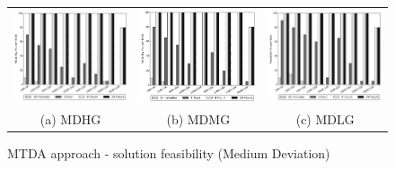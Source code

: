 \begin{figure}
\begin{tabular}{ccc}
\includegraphics[width=.30\linewidth,keepaspectratio]{figs/feasibility_cvs_oarb_medium_highr_mtd.png} &
\includegraphics[width=.30\linewidth,keepaspectratio]{figs/feasibility_cvs_oarb_medium_mediumr_mtd.png} &
\includegraphics[width=.30\linewidth,keepaspectratio]{figs/feasibility_cvs_oarb_medium_lowr_mtd.png} \\
(a) MDHG & (b) MDMG & (c) MDLG
\end{tabular}
\caption{MTDA approach - solution feasibility (Medium Deviation)}
\label{fig:mtd_mfmr}
\end{figure}


